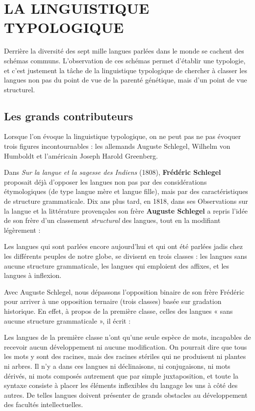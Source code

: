 \section{LA LINGUISTIQUE TYPOLOGIQUE}
Derrière la diversité des sept mille langues parlées dans le monde se cachent des schémas communs. L’observation de ces schémas permet d’établir une typologie, et c’est justement la tâche de la linguistique typologique de chercher à classer les langues non pas du point de vue de la parenté génétique, mais d’un point de vue structurel.

\subsection{Les grands contributeurs}
Lorsque l’on évoque la linguistique typologique, on ne peut pas ne pas évoquer trois figures incontournables : les allemands Auguste Schlegel, Wilhelm von Humboldt et l’américain Joseph Harold Greenberg.

Dans \textit{Sur la langue et la sagesse des Indiens} (1808), \textbf{Frédéric Schlegel} proposait déjà d’opposer les langues non pas par des considérations étymologiques (de type langue mère et langue fille), mais par des caractéristiques de structure grammaticale. Dix ans plus tard, en 1818, dans ses Observations sur la langue et la littérature provençales son frère \textbf{Auguste Schlegel} a repris l’idée de son frère d’un classement \textit{structural} des langues, tout en la modifiant légèrement :
\begin{lecture}{}
Les langues qui sont parlées encore aujourd’hui et qui ont été parlées jadis chez les différents peuples de notre globe, se divisent en trois classes : les langues sans aucune structure grammaticale, les langues qui emploient des affixes, et les langues à inflexion.
\end{lecture}
Avec Auguste Schlegel, nous dépassons l’opposition binaire de son frère Frédéric pour arriver à une opposition ternaire (trois classes) basée sur gradation historique. En effet, à propos de la première classe, celles des langues « sans aucune structure grammaticale », il écrit :
\begin{lecture}{}
Les langues de la première classe n’ont qu’une seule espèce de mots, incapables de recevoir aucun développement ni aucune modification. On pourrait dire que tous les mots y sont des racines, mais des racines stériles qui ne produisent ni plantes ni arbres. Il n’y a dans ces langues ni déclinaisons, ni conjugaisons, ni mots dérivés, ni mots composés autrement que par simple juxtaposition, et toute la syntaxe consiste à placer les éléments inflexibles du langage les uns à côté des autres. De telles langues doivent présenter de grands obstacles au développement des facultés intellectuelles.
\end{lecture}


